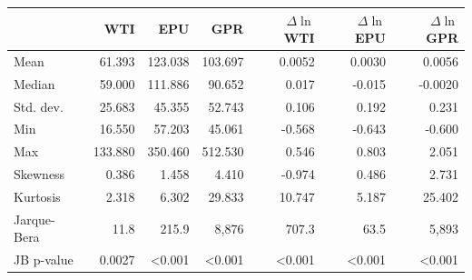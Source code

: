 \begin{tabular}{lrrrrrr}
\toprule
 & WTI & EPU & GPR & $\Delta\ln$WTI & $\Delta\ln$EPU & $\Delta\ln$GPR \\
\midrule
Mean & 61.393 & 123.038 & 103.697 & 0.0052 & 0.0030 & 0.0056 \\
Median & 59.000 & 111.886 & 90.652 & 0.017 & -0.015 & -0.0020 \\
Std. dev. & 25.683 & 45.355 & 52.743 & 0.106 & 0.192 & 0.231 \\
Min & 16.550 & 57.203 & 45.061 & -0.568 & -0.643 & -0.600 \\
Max & 133.880 & 350.460 & 512.530 & 0.546 & 0.803 & 2.051 \\
Skewness & 0.386 & 1.458 & 4.410 & -0.974 & 0.486 & 2.731 \\
Kurtosis & 2.318 & 6.302 & 29.833 & 10.747 & 5.187 & 25.402 \\
Jarque-Bera & 11.8 & 215.9 & 8,876 & 707.3 & 63.5 & 5,893 \\
JB p-value & 0.0027 & <0.001 & <0.001 & <0.001 & <0.001 & <0.001 \\
\bottomrule
\end{tabular}
